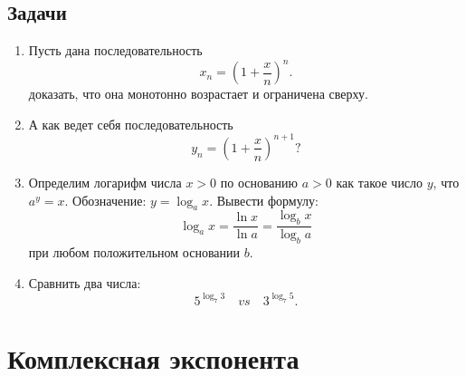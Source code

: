 \subsection*{Задачи}
\begin{enumerate}
\item Пусть дана последовательность
$$
x_n = \left(1+\frac xn\right)^n.
$$
доказать, что она монотонно возрастает и ограничена сверху.
\item А как ведет себя последовательность
$$
y_n = \left(1+\frac xn\right)^{n+1}?
$$
\item Определим логарифм числа $x>0$ по основанию $a>0$ как такое число $y$, что $a^y=x$. Обозначение: $y=\log_a x$. Вывести формулу:
$$
\log_a x = \frac{\ln x}{\ln a} = \frac{\log_b x}{\log_b a}
$$
при любом положительном основании $b$.
\item Сравнить два числа:
$$
5^{\log_7 3}\quad vs\quad   3^{\log_7 5}.
$$

\end{enumerate}



\section{Комплексная экспонента}



